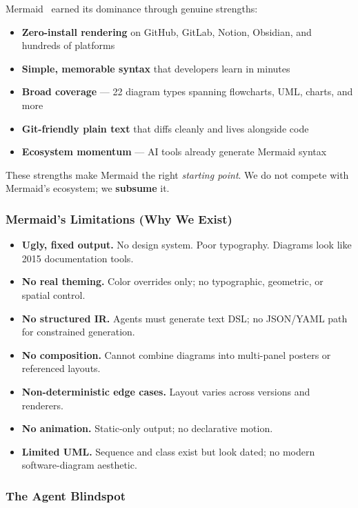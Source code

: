 Mermaid~\cite{mermaid2023} earned its dominance through genuine strengths:

\begin{itemize}
  \item \textbf{Zero-install rendering} on GitHub, GitLab, Notion, Obsidian, and hundreds of platforms
  \item \textbf{Simple, memorable syntax} that developers learn in minutes
  \item \textbf{Broad coverage} --- 22 diagram types spanning flowcharts, UML, charts, and more
  \item \textbf{Git-friendly plain text} that diffs cleanly and lives alongside code
  \item \textbf{Ecosystem momentum} --- AI tools already generate Mermaid syntax
\end{itemize}

These strengths make Mermaid the right \emph{starting point}. We do not compete with Mermaid's ecosystem; we \textbf{subsume} it.

\subsubsection{Mermaid's Limitations (Why We Exist)}

\begin{itemize}
  \item \textbf{Ugly, fixed output.} No design system. Poor typography. Diagrams look like 2015 documentation tools.
  \item \textbf{No real theming.} Color overrides only; no typographic, geometric, or spatial control.
  \item \textbf{No structured IR.} Agents must generate text DSL; no JSON/YAML path for constrained generation.
  \item \textbf{No composition.} Cannot combine diagrams into multi-panel posters or referenced layouts.
  \item \textbf{Non-deterministic edge cases.} Layout varies across versions and renderers.
  \item \textbf{No animation.} Static-only output; no declarative motion.
  \item \textbf{Limited UML.} Sequence and class exist but look dated; no modern software-diagram aesthetic.
\end{itemize}

\subsubsection{The Agent Blindspot}

